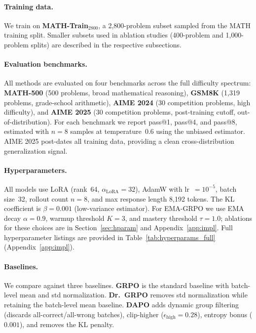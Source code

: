 \documentclass[11pt]{article}
\newcommand{\method}{EMA-GRPO}
\theoremstyle{definition}
\begin{document}
\paragraph{Training data.}
We train on \textbf{MATH-Train$_{\text{2800}}$}, a 2{,}800-problem subset
sampled from the MATH training split.
Smaller subsets used in ablation studies (400-problem and 1{,}000-problem splits)
are described in the respective subsections.

\paragraph{Evaluation benchmarks.}
All methods are evaluated on four benchmarks across the full difficulty spectrum:
\textbf{MATH-500} (500 problems, broad mathematical reasoning),
\textbf{GSM8K} (1{,}319 problems, grade-school arithmetic),
\textbf{AIME 2024} (30 competition problems, high difficulty), and
\textbf{AIME 2025} (30 competition problems, post-training cutoff, out-of-distribution).
For each benchmark we report pass@1, pass@4, and pass@8, estimated with
$n=8$ samples at temperature~0.6 using the unbiased estimator.
AIME 2025 post-dates all training data, providing a clean cross-distribution
generalization signal.

\paragraph{Hyperparameters.}
All models use LoRA (rank~64, $\alpha_{\mathrm{LoRA}}=32$), AdamW with
lr~$=10^{-5}$, batch size~32, rollout count $n=8$, and max response
length 8{,}192 tokens.
The KL coefficient is $\beta=0.001$ (low-variance estimator).
For \method{} we use EMA decay $\alpha=0.9$, warmup threshold $K=3$,
and mastery threshold $\tau=1.0$; ablations for these choices are in
Section~\ref{sec:hparam} and Appendix~\ref{app:impl}.
Full hyperparameter listings are provided in Table~\ref{tab:hyperparams_full}
(Appendix~\ref{app:impl}).

\paragraph{Baselines.}
We compare against three baselines.
\textbf{GRPO} is the standard baseline with batch-level mean and std normalization.
\textbf{Dr.~GRPO} removes std normalization while retaining the batch-level mean baseline.
\textbf{DAPO} adds dynamic group filtering (discards all-correct/all-wrong batches),
clip-higher ($\epsilon_{\mathrm{high}}=0.28$), entropy bonus ($0.001$),
and removes the KL penalty.
\end{document}
